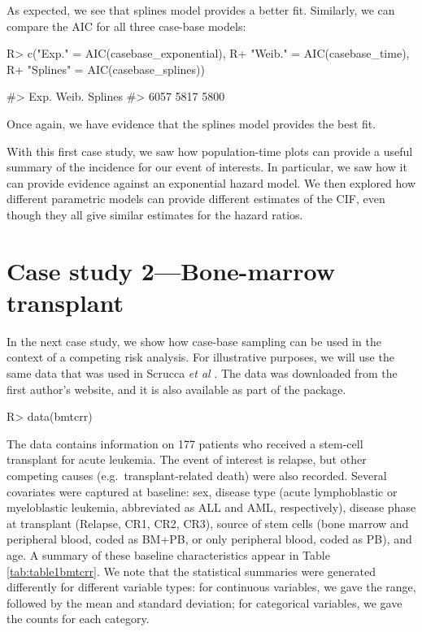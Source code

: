 \documentclass[
]{jss}
\begin{document}
As expected, we see that splines model provides a better fit. Similarly,
we can compare the AIC for all three case-base models:

\begin{CodeChunk}

\begin{CodeInput}
R> c("Exp." = AIC(casebase_exponential),
R+   "Weib." = AIC(casebase_time),
R+   "Splines" = AIC(casebase_splines))
\end{CodeInput}

\begin{CodeOutput}
#>    Exp.   Weib. Splines 
#>    6057    5817    5800
\end{CodeOutput}
\end{CodeChunk}

Once again, we have evidence that the splines model provides the best
fit.

With this first case study, we saw how population-time plots can provide
a useful summary of the incidence for our event of interests. In
particular, we saw how it can provide evidence against an exponential
hazard model. We then explored how different parametric models can
provide different estimates of the CIF, even though they all give
similar estimates for the hazard ratios.

\hypertarget{case-study-2bone-marrow-transplant}{%
\section{Case study 2---Bone-marrow
transplant}\label{case-study-2bone-marrow-transplant}}

In the next case study, we show how case-base sampling can be used in
the context of a competing risk analysis. For illustrative purposes, we
will use the same data that was used in Scrucca \emph{et al}
\citeyearpar{scrucca2010regression}. The data was downloaded from the
first author's website, and it is also available as part of the
 package.

\begin{CodeChunk}

\begin{CodeInput}
R> data(bmtcrr)
\end{CodeInput}
\end{CodeChunk}

The data contains information on 177 patients who received a stem-cell
transplant for acute leukemia. The event of interest is relapse, but
other competing causes (e.g.~transplant-related death) were also
recorded. Several covariates were captured at baseline: sex, disease
type (acute lymphoblastic or myeloblastic leukemia, abbreviated as ALL
and AML, respectively), disease phase at transplant (Relapse, CR1, CR2,
CR3), source of stem cells (bone marrow and peripheral blood, coded as
BM+PB, or only peripheral blood, coded as PB), and age. A summary of
these baseline characteristics appear in Table \ref{tab:table1bmtcrr}.
We note that the statistical summaries were generated differently for
different variable types: for continuous variables, we gave the range,
followed by the mean and standard deviation; for categorical variables,
we gave the counts for each category.
\end{document}
